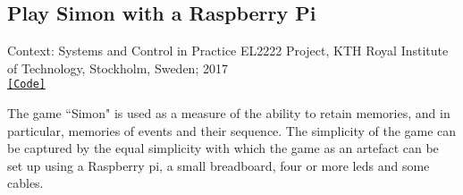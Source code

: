 \subsection{Play Simon with a Raspberry Pi}

Context: Systems and Control in Practice EL2222 Project, KTH Royal Institute of
Technology, Stockholm, Sweden; 2017\\

\noindent \href{https://github.com/li9i/EL2222_Project}{\texttt{[Code]}}

The game ``Simon" is used as a measure of the ability to retain memories, and in
particular, memories of events and their sequence. The simplicity of the game
can be captured by the equal simplicity with which the game as an artefact can
be set up using a Raspberry pi, a small breadboard, four or more leds
and some cables.
